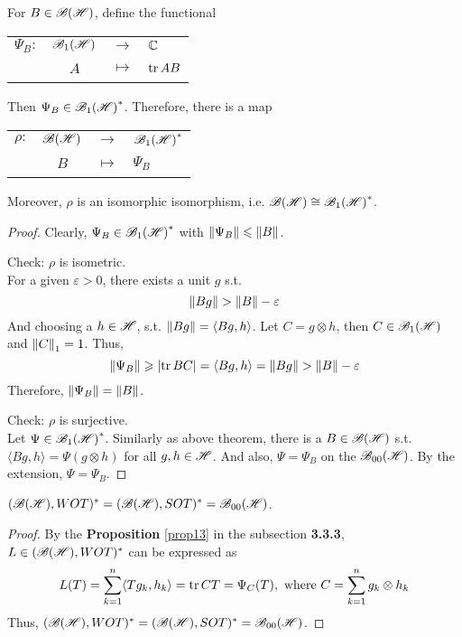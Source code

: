 \begin{thm}
	For $B \in \mathscr{B(H)}$, define the functional
	\begin{center}
		\begin{tabular}{l c c l}
			$\Psi_B \colon$ & $\mathscr{B}_{1}\mathscr{(H)}$ & $\longrightarrow$ & $\mathbb{C}$ \\
			~ & $A$ & $\longmapsto$ & $\operatorname{tr}{AB}$
		\end{tabular}
	\end{center}
	Then $\Psi_B \in \mathscr{B}_{1}\mathscr{(H)}^{*}$. Therefore, there is a map
	\begin{center}
		\begin{tabular}{l c c l}
			$\rho \colon$ & $\mathscr{B(H)}$ & $\longrightarrow$ & $\mathscr{B}_{1}\mathscr{(H)}^{*}$ \\
			~ & $B$ & $\longmapsto$ & $\Psi_B$
		\end{tabular}
	\end{center}
	Moreover, $\rho$ is an isomorphic isomorphism, i.e. $\mathscr{B(H)} \cong \mathscr{B}_{1}\mathscr{(H)}^{*}$. 
\end{thm}
\begin{proof}
	Clearly, $\Psi_B \in \mathscr{B}_{1}\mathscr{(H)}^{*}$ with $\left\lVert\Psi_B\right\lVert \leqslant \left\lVert B\right\lVert$.
	\item Check: $\rho$ is isometric. \\
	For a given $\varepsilon > 0$, there exists a unit $g$ s.t. 
	\begin{equation*}
		\left\lVert Bg\right\lVert > \left\lVert B\right\lVert-\varepsilon
	\end{equation*}
	And choosing a $h \in \mathscr{H}$, s.t. $\left\lVert Bg\right\lVert = \langle Bg,h \rangle$. Let $C = g \otimes h$, then $C \in \mathscr{B}_{1}\mathscr{(H)}$ and $\left\lVert C\right\lVert_1 = 1$.  Thus,
	\begin{equation*}
		\left\lVert\Psi_B\right\lVert \geqslant \left\lvert\operatorname{tr}{BC}\right\lvert = \langle Bg,h \rangle = \left\lVert Bg\right\lVert > \left\lVert B\right\lVert-\varepsilon
	\end{equation*}
	Therefore, $\left\lVert\Psi_B\right\lVert = \left\lVert B\right\lVert$.
	\item Check: $\rho$ is surjective.\\
	Let $\Psi \in \mathscr{B}_{1}\mathscr{(H)}^{*}$. Similarly as above theorem, there is a $B \in \mathscr{B(H)}$ s.t. $\langle Bg,h \rangle = \Psi(g \otimes h)$ for all $g,h \in \mathscr{H}$. And also, $\Psi = \Psi_B$ on the $\mathscr{B}_{00}\mathscr{(H)}$. By the extension, $\Psi = \Psi_B$.
\end{proof}

\begin{thm}
	$(\mathscr{B(H)}, WOT)^{*} = (\mathscr{B(H)}, SOT)^{*} = \mathscr{B}_{00}\mathscr{(H)}$.
\end{thm}
\begin{proof}
	By the \textbf{Proposition} \ref{prop13} in the subsection \textbf{3.3.3},  $L \in (\mathscr{B(H)}, WOT)^{*}$ can be expressed as
	\begin{equation*}
		L(T) = \sum_{k=1}^n \langle Tg_k, h_k \rangle = \operatorname{tr}{CT} = \Psi_C(T), \text{ where } C = \sum_{k=1}^n g_k \otimes h_k
	\end{equation*}
	Thus, $(\mathscr{B(H)}, WOT)^{*} = (\mathscr{B(H)}, SOT)^{*} = \mathscr{B}_{00}\mathscr{(H)}$.
\end{proof}

